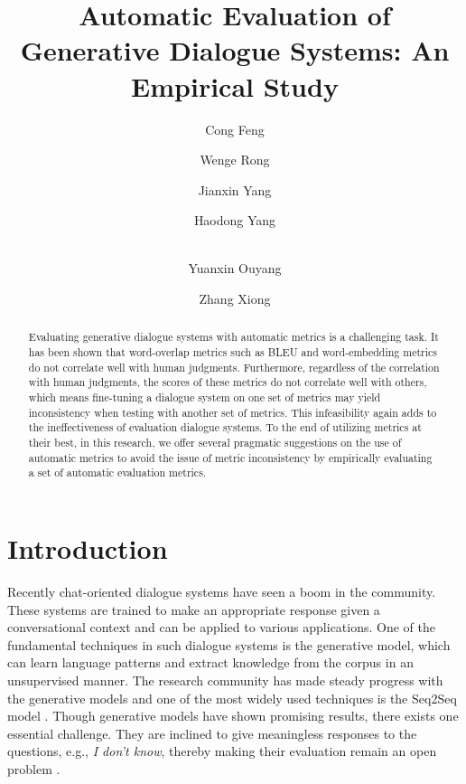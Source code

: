 \documentclass[runningheads]{llncs}
\begin{document}
    \title{Automatic Evaluation of Generative Dialogue Systems: An Empirical Study}
    \author{Cong Feng \and Wenge Rong \and Jianxin Yang \and Haodong Yang \and \\Yuanxin Ouyang \and Zhang Xiong}

    \maketitle

    \begin{abstract}
        Evaluating generative dialogue systems with automatic metrics is a challenging task. It has been shown that word-overlap metrics such as BLEU and word-embedding metrics do not correlate well with human judgments. Furthermore, regardless of the correlation with human judgments, the scores of these metrics do not correlate well with others, which means fine-tuning a dialogue system on one set of metrics may yield inconsistency when testing with another set of metrics. This infeasibility again adds to the ineffectiveness of evaluation dialogue systems. To the end of utilizing metrics at their best, in this research, we offer several pragmatic suggestions on the use of automatic metrics to avoid the issue of metric inconsistency by empirically evaluating a set of automatic evaluation metrics.
    \end{abstract}

    \section{Introduction}
    Recently chat-oriented dialogue systems have seen a boom in the community. These systems are trained to make an appropriate response given a conversational context and can be applied to various applications. One of the fundamental techniques in such dialogue systems is the generative model, which can learn language patterns and extract knowledge from the corpus in an unsupervised manner. The research community has made steady progress with the generative models and one of the most widely used techniques is the Seq2Seq model \cite{Seq2Seq}. Though generative models have shown promising results, there exists one essential challenge. They are inclined to give meaningless responses to the questions, e.g., \textit{I don't know}, thereby making their evaluation remain an open problem \cite{HowNot}.
\end{document}
